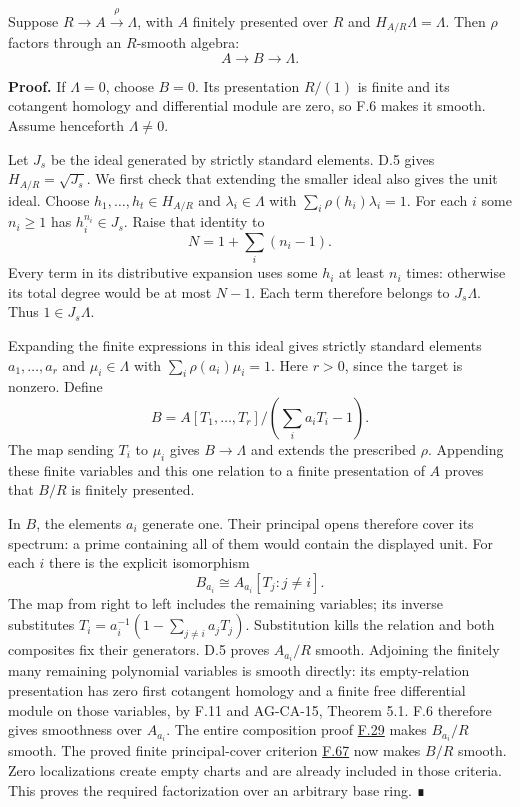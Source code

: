 \documentclass[11pt,a4paper,openany]{report}
\begin{document}
Suppose \(R\to A\xrightarrow{\rho}\Lambda\), with \(A\) finitely presented over \(R\) and \(H_{A/R}\Lambda=\Lambda\). Then \(\rho\) factors through an \(R\)-smooth algebra: \[A\longrightarrow B\longrightarrow\Lambda.\]

\textbf{Proof.} If \(\Lambda=0\), choose \(B=0\). Its presentation \(R/(1)\) is finite and its cotangent homology and differential module are zero, so F.6 makes it smooth. Assume henceforth \(\Lambda\ne0\).

Let \(J_s\) be the ideal generated by strictly standard elements. D.5 gives \(H_{A/R}=\sqrt{J_s}\). We first check that extending the smaller ideal also gives the unit ideal. Choose \(h_1,\ldots,h_t\in H_{A/R}\) and \(\lambda_i\in\Lambda\) with \(\sum_i\rho(h_i)\lambda_i=1\). For each \(i\) some \(n_i\geq1\) has \(h_i^{n_i}\in J_s\). Raise that identity to \[N=1+\sum_i(n_i-1).\] Every term in its distributive expansion uses some \(h_i\) at least \(n_i\) times: otherwise its total degree would be at most \(N-1\). Each term therefore belongs to \(J_s\Lambda\). Thus \(1\in J_s\Lambda\).

Expanding the finite expressions in this ideal gives strictly standard elements \(a_1,\ldots,a_r\) and \(\mu_i\in\Lambda\) with \(\sum_i\rho(a_i)\mu_i=1\). Here \(r>0\), since the target is nonzero. Define \[B=A[T_1,\ldots,T_r]/\left(\sum_i a_iT_i-1\right).\] The map sending \(T_i\) to \(\mu_i\) gives \(B\to\Lambda\) and extends the prescribed \(\rho\). Appending these finite variables and this one relation to a finite presentation of \(A\) proves that \(B/R\) is finitely presented.

In \(B\), the elements \(a_i\) generate one. Their principal opens therefore cover its spectrum: a prime containing all of them would contain the displayed unit. For each \(i\) there is the explicit isomorphism \[B_{a_i}\cong A_{a_i}[T_j:j\ne i].\] The map from right to left includes the remaining variables; its inverse substitutes \(T_i=a_i^{-1}(1-\sum_{j\ne i}a_jT_j)\). Substitution kills the relation and both composites fix their generators. D.5 proves \(A_{a_i}/R\) smooth. Adjoining the finitely many remaining polynomial variables is smooth directly: its empty-relation presentation has zero first cotangent homology and a finite free differential module on those variables, by F.11 and AG-CA-15, Theorem 5.1. F.6 therefore gives smoothness over \(A_{a_i}\). The entire composition proof \hyperref[AG-RG-S05-algebra-lemma-compose-smooth]{F.29} makes \(B_{a_i}/R\) smooth. The proved finite principal-cover criterion \hyperref[AG-RG-S05-algebra-lemma-locally-smooth]{F.67} now makes \(B/R\) smooth. Zero localizations create empty charts and are already included in those criteria. This proves the required factorization over an arbitrary base ring. ∎
\end{document}
